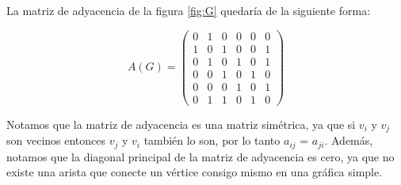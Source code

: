 \begin{example}
    La matriz de adyacencia de la figura \ref{fig:G} quedaría de la siguiente forma:
\begin{center}
\begin{equation}
A(G) =
\begin{pmatrix}
0 & 1 & 0 & 0 & 0 & 0\\
1 & 0 & 1 & 0 & 0 & 1\\
0 & 1 & 0 & 1 & 0 & 1\\
0 & 0 & 1 & 0 & 1 & 0\\
0 & 0 & 0 & 1 & 0 & 1\\
0 & 1 & 1 & 0 & 1 & 0
\end{pmatrix}
\end{equation}
    
\end{center}
\end{example}
\noindent Notamos que la matriz de adyacencia es una matriz simétrica, ya que si $v_i$ y $v_j$ son vecinos entonces $v_j$ y $v_i$ también lo son, por lo tanto $a_{ij}$ = $a_{ji}$.
\noindent Además, notamos que la diagonal principal de la matriz de adyacencia es cero, ya que no existe una arista que conecte un vértice consigo mismo en una gráfica simple.

